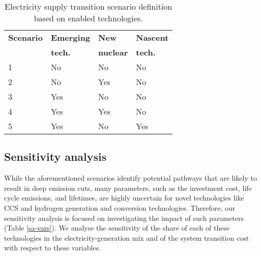 \begin{table}[!ht]
\centering
	\caption{Electricity supply transition scenario definition based on enabled technologies.}
	\vspace{0.1in}
	\begin{tabularx}{0.65\textwidth}{p{} p{} p{} p{}}
\hline 
\textbf{Scenario}& \textbf{Emerging} & \textbf{New} & \textbf{Nascent}\\
 & \textbf{tech.} & \textbf{nuclear} & \textbf{tech.}\\

                  \hline
1               &  No       &         No     &     No  \\ 
2               &   No       &      Yes     &     No  \\ 
3               &   Yes     &         No      &     No   \\
4               &   Yes     &      Yes     &     No  \\ 
5               &   Yes     &      No     &     Yes  \\ 
\hline
	\end{tabularx}
\label{scen-table}
\end{table}



\subsection{Sensitivity analysis}
While the aforementioned scenarios identify potential pathways that are likely to result in deep emission cuts, many parameters, such as the investment cost, life cycle emissions, and lifetimes, are highly uncertain for novel technologies like \gls{CCS} and hydrogen generation and conversion technologies. Therefore, our sensitivity analysis is focused on investigating the impact of such parameters (Table \ref{sa-vars}). We analyse the sensitivity of the share of each of these technologies in the electricity-generation mix and of the system transition cost with respect to these variables.

